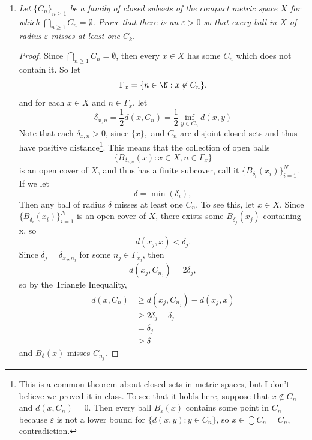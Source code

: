 \documentclass[12pt,letterpaper]{article}
\begin{document}
\begin{enumerate}
\vfill
\pagebreak
\item \textit{Let $\{C_n\}_{n\geq1}$ be a family of closed subsets of the compact metric space $X$ for which \linebreak $\bigcap_{n\geq1}C_n=\emptyset$. Prove that there is an $\varepsilon>0$ so that every ball in $X$ of radius $\varepsilon$ misses at least one $C_k$. }
\begin{proof} Since $\bigcap_{n\geq1}C_n=\emptyset$, then every $x\in X$ has some $C_n$ which does not contain it. So let 
$$\Gamma_x=\{n\in\N : x\not\in C_n\},$$
and for each $x\in X$ and $n\in \Gamma_x$, let 
$$\delta_{x,n}=\frac{1}{2}	d(x,C_n)=\frac{1}{2}\inf_{y\in C_n} d(x,y)$$
Note that each $\delta_{x,n}>0$, since $\{x\},$ and $C_n$ are disjoint closed sets and thus have positive distance\footnote{This is a common theorem about closed sets in metric spaces, but I don't believe we proved it in class. To see that it holds here, suppose that $x\not\in C_n$ and $d(x,C_n)=0$. Then every ball $B_\varepsilon(x)$ contains some point in $C_n$ because $\varepsilon$ is not a lower bound for $\{d(x,y):y\in C_n\}$, so $x\in \closure{C_n}=C_n$, contradiction.}. 
This means that the collection of open balls 
$$\{B_{\delta_{x,n}}(x) : {x\in X, n\in\Gamma_x} \}$$
is an open cover of $X$, and thus has a finite subcover, call it $\{B_{\delta_i}(x_i)\}_{i=1}^N.$ If we let 
$$\delta=\min(\delta_i),$$
Then any ball of radius $\delta$ misses at least one $C_n$. To see this, let $x\in X$. Since $\{B_{\delta_i}(x_i)\}_{i=1}^N$ is an open cover of $X$, there exists some $B_{\delta_j}(x_j)$ containing x, so
$$d(x_j,x)<\delta_j.$$
Since $\delta_j=\delta_{x_j,n_j}$ for some $n_j\in\Gamma_{x_j}$, then 
$$d(x_j,C_{n_j})=2\delta_j,$$
so by the Triangle Inequality, 
\begin{align*}
d(x,C_n) &\geq d(x_j,C_{n_j})-d(x_j,x) \\
&\geq 2\delta_j - \delta_j \\
&=\delta_j \\
&\geq\delta
\end{align*}
and $B_\delta(x)$ misses $C_{n_j}$. 
\end{proof}


\end{enumerate}
\end{document}
